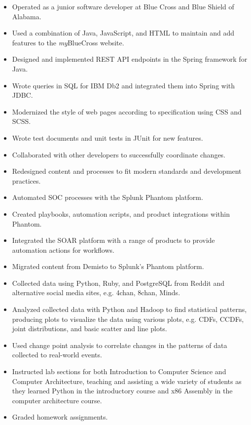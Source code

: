 \documentclass[10pt]{setzerresume}
\begin{document}
  \begin{itemize}[nosep]
    \item Operated as a junior software developer at Blue Cross and Blue Shield of Alabama.
    \item Used a combination of Java, JavaScript, and HTML to maintain and add features to the \textit{my}BlueCross website.
    \item Designed and implemented REST API endpoints in the Spring framework for Java.
    \item Wrote queries in SQL for IBM Db2 and integrated them into Spring with JDBC. %
    \item Modernized the style of web pages according to specification using CSS and SCSS. %
    \item Wrote test documents and unit tests in JUnit for new features.
    \item Collaborated with other developers to successfully coordinate changes.
  \end{itemize}



  \begin{itemize}[nosep]
    \item Redesigned content and processes to fit modern standards and development practices.
    \item Automated SOC processes with the Splunk Phantom platform.
    \item Created playbooks, automation scripts, and product integrations within Phantom.
    \item Integrated the SOAR platform with a range of products to provide automation actions for workflows.
    \item Migrated content from Demisto to Splunk's Phantom platform.
  \end{itemize}



  \begin{itemize}[nosep]%
    \item Collected data using Python, Ruby, and PostgreSQL from Reddit and alternative social media sites, e.g. 4chan, 8chan, Minds.
    \item Analyzed collected data with Python and Hadoop to find statistical patterns, producing plots to visualize the data using various plots, e.g. CDFs, CCDFs, joint distributions, and basic scatter and line plots.
    \item Used change point analysis to correlate changes in the patterns of data collected to real-world events.
    \item Instructed lab sections for both Introduction to Computer Science and Computer Architecture, teaching and assisting a wide variety of students as they learned Python in the introductory course and x86 Assembly in the computer architecture course.
    \item Graded homework assignments.
  \end{itemize}
\end{document}
